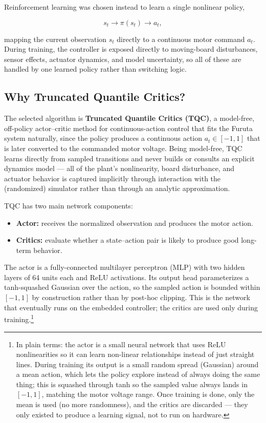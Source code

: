 \documentclass[9pt]{extarticle}
\begin{document}
Reinforcement learning was chosen instead to learn a single nonlinear
policy,

\begin{equation}
s_t \longrightarrow \pi(s_t) \longrightarrow a_t,
\end{equation}

mapping the current observation $s_t$ directly to a continuous motor
command $a_t$. During training, the controller is exposed directly to
moving-board disturbances, sensor effects, actuator dynamics, and model
uncertainty, so all of these are handled by one learned policy rather than
switching logic.

\subsection{Why Truncated Quantile Critics?}

The selected algorithm is \textbf{Truncated Quantile Critics (TQC)}, a
model-free, off-policy actor--critic method for continuous-action control
that fits the Furuta system naturally, since the policy produces a
continuous action $a_t \in [-1,1]$ that is later converted to the commanded
motor voltage. Being model-free, TQC learns directly from sampled
transitions and never builds or consults an explicit dynamics model — all
of the plant's nonlinearity, board disturbance, and actuator behavior is
captured implicitly through interaction with the (randomized) simulator
rather than through an analytic approximation.

TQC has two main network components:

\begin{itemize}
    \item \textbf{Actor:} receives the normalized observation and produces
    the motor action.
    \item \textbf{Critics:} evaluate whether a state--action pair is likely
    to produce good long-term behavior.
\end{itemize}

The actor is a fully-connected multilayer perceptron (MLP) with two hidden
layers of 64 units each and ReLU activations. Its output head parameterizes
a tanh-squashed Gaussian over the action, so the sampled action is bounded
within $[-1,1]$ by construction rather than by post-hoc clipping. This is
the network that eventually runs on the embedded controller; the critics
are used only during training.\footnote{In plain terms: the actor is a
small neural network that uses ReLU nonlinearities so it can learn
non-linear relationships instead of just straight lines. During training
its output is a small random spread (Gaussian) around a mean action, which
lets the policy explore instead of always doing the same thing; this is
squashed through tanh so the sampled value always lands in $[-1,1]$,
matching the motor voltage range. Once training is done, only the mean is
used (no more randomness), and the critics are discarded — they only
existed to produce a learning signal, not to run on hardware.}
\end{document}
